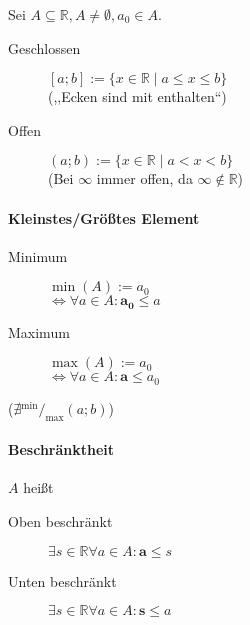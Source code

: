 Sei $A \subseteq \mathbb{R}, A \neq \emptyset, a_0 \boldsymbol{\in} A$.

\begin{description}
  \item [Geschlossen]
        $[a;b] := \{ x \in \mathbb{R} \mid a \boldsymbol{\leq} x \boldsymbol{\leq} b \}$ \\
        (,,Ecken sind mit enthalten``)

  \item [Offen]
        $(a;b) := \{x \in \mathbb{R} \mid a \boldsymbol{<} x \boldsymbol{<} b\}$ \\
        (Bei $\infty$ immer offen, da $\infty \notin \mathbb{R}$)
\end{description}

\paragraph{Kleinstes/Grö\ss tes Element}

\begin{description}
  \item [Minimum]
        $\min(A) := a_0$ \\
        $\Leftrightarrow \forall a \in A: \mathbf{a_0} \boldsymbol{\leq} a$

  \item [Maximum]
        $\max(A) := a_0$ \\
        $\Leftrightarrow \forall a \in A: \mathbf{a} \boldsymbol{\leq} a_0$
\end{description}

($\nexists {}^{\min}/_{\max} (a;b)$)

\paragraph{Beschränktheit} $A$ hei\ss t

\begin{description}
  \item [Oben beschränkt]
        $\exists s \in \mathbb{R} \forall a \in A: \mathbf{a} \boldsymbol{\leq} s$

  \item [Unten beschränkt]
        $\exists s \in \mathbb{R} \forall a \in A: \mathbf{s} \boldsymbol{\leq} a$
\end{description}

